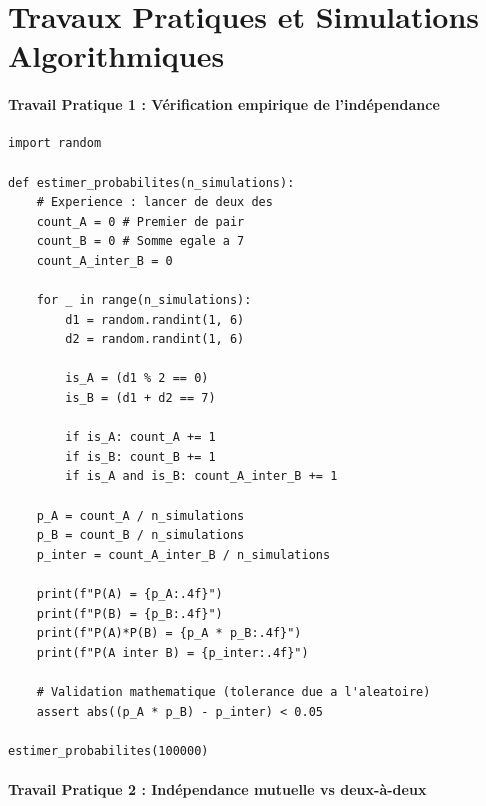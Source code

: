 \documentclass[11pt,a4paper]{article}
\begin{document}
\part{Travaux Pratiques et Simulations Algorithmiques}

\subsection*{Travail Pratique 1 : Vérification empirique de l'indépendance}

\begin{lstlisting}
import random

def estimer_probabilites(n_simulations):
    # Experience : lancer de deux des
    count_A = 0 # Premier de pair
    count_B = 0 # Somme egale a 7
    count_A_inter_B = 0

    for _ in range(n_simulations):
        d1 = random.randint(1, 6)
        d2 = random.randint(1, 6)

        is_A = (d1 % 2 == 0)
        is_B = (d1 + d2 == 7)

        if is_A: count_A += 1
        if is_B: count_B += 1
        if is_A and is_B: count_A_inter_B += 1

    p_A = count_A / n_simulations
    p_B = count_B / n_simulations
    p_inter = count_A_inter_B / n_simulations

    print(f"P(A) = {p_A:.4f}")
    print(f"P(B) = {p_B:.4f}")
    print(f"P(A)*P(B) = {p_A * p_B:.4f}")
    print(f"P(A inter B) = {p_inter:.4f}")

    # Validation mathematique (tolerance due a l'aleatoire)
    assert abs((p_A * p_B) - p_inter) < 0.05

estimer_probabilites(100000)
\end{lstlisting}


\subsection*{Travail Pratique 2 : Indépendance mutuelle vs deux-à-deux}
\end{document}
